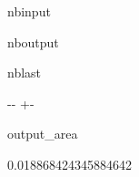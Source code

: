 \documentclass[letterpaper,10pt,english]{sphinxmanual}
\begin{document}
\begin{sphinxuseclass}{nbinput}
{
\begin{sphinxVerbatim}[commandchars=\\\{\}]
\llap{\color{nbsphinxin}[4]:\,\hspace{\fboxrule}\hspace{\fboxsep}}\PYG{p}{[}\PYG{p}{]}
\end{sphinxVerbatim}
}

\end{sphinxuseclass}
\begin{sphinxuseclass}{nboutput}
\begin{sphinxuseclass}{nblast}
{

\kern-\sphinxverbatimsmallskipamount\kern-\baselineskip
\kern+\FrameHeightAdjust\kern-\fboxrule
\vspace{\nbsphinxcodecellspacing}

\begin{sphinxuseclass}{output_area}
\begin{sphinxuseclass}{}


\begin{sphinxVerbatim}[commandchars=\\\{\}]
\llap{\color{nbsphinxout}[4]:\,\hspace{\fboxrule}\hspace{\fboxsep}}0.018868424345884642
\end{sphinxVerbatim}



\end{sphinxuseclass}
\end{sphinxuseclass}
}

\end{sphinxuseclass}
\end{sphinxuseclass}
\end{document}
